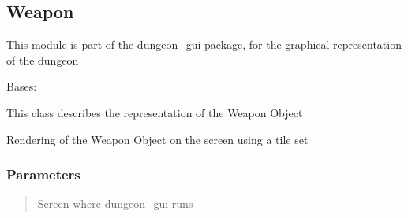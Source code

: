 \documentclass[letterpaper,10pt,english]{sphinxmanual}
\begin{document}
\sphinxstepscope


\subsection{Weapon}
\label{\detokenize{api_reference/dungeon_gui/Weapon:module-Weapon}}\label{\detokenize{api_reference/dungeon_gui/Weapon:weapon}}\label{\detokenize{api_reference/dungeon_gui/Weapon::doc}}
\sphinxAtStartPar
This module is part of the dungeon\_gui package, for the graphical representation of the dungeon

\begin{fulllineitems}
\label{\detokenize{api_reference/dungeon_gui/Weapon:Weapon.Weapon}}
\pysigstartsignatures
{}
\pysigstopsignatures
\sphinxAtStartPar
Bases: 

\sphinxAtStartPar
This class describes the representation of the Weapon Object

\begin{fulllineitems}
\label{\detokenize{api_reference/dungeon_gui/Weapon:Weapon.Weapon.render_collectable}}
\pysigstartsignatures
{}
\pysigstopsignatures
\sphinxAtStartPar
Rendering of the Weapon Object on the screen using a tile set


\subsubsection{Parameters}
\label{\detokenize{api_reference/dungeon_gui/Weapon:parameters}}\begin{quote}\begin{description}
\sphinxAtStartPar
Screen where dungeon\_gui runs


\end{description}
\end{quote}
\end{fulllineitems}
\end{fulllineitems}
\end{document}
